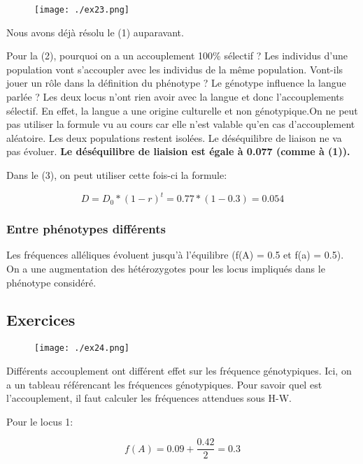 \documentclass{article}
\begin{document}
\begin{figure}[H]
\texttt{[image: ./ex23.png]}
\end{figure}

Nous avons déjà résolu le (1) auparavant.

Pour la (2), pourquoi on a un accouplement 100\% sélectif ? Les individus d'une population vont s'accoupler avec les individus de la même population. Vont-ils jouer un rôle dans la définition du phénotype ? Le génotype influence la langue parlée ? Les deux locus n'ont rien avoir avec la langue et donc l'accouplements sélectif. En effet, la langue a une origine culturelle et non génotypique.On ne peut pas utiliser la formule vu au cours car elle n'est valable qu'en cas d'accouplement aléatoire. Les deux populations restent isolées. Le déséquilibre de liaison ne va pas évoluer. \textbf{Le déséquilibre de liaision est égale à 0.077 (comme à (1)).}

Dans le (3), on peut utiliser cette fois-ci la formule:

\begin{equation}
D = D_0 * (1-r)^t = 0.77 * (1-0.3) = 0.054
\end{equation}

\subsubsection{Entre phénotypes différents}
Les fréquences alléliques évoluent jusqu'à l'équilibre (f(A) = 0.5 et f(a) = 0.5). On a une augmentation des hétérozygotes pour les locus impliqués dans le phénotype considéré.

\pagebreak
\subsection{Exercices}

\begin{figure}[H]
\texttt{[image: ./ex24.png]}
\end{figure}

Différents accouplement ont différent effet sur les fréquence génotypiques. Ici, on a un tableau référencant les fréquences génotypiques. Pour savoir quel est l'accouplement, il faut calculer les fréquences attendues sous H-W.

Pour le locus 1:

\begin{equation}
f(A) = 0.09 + \frac{0.42}{2} = 0.3
\end{equation}
\end{document}

